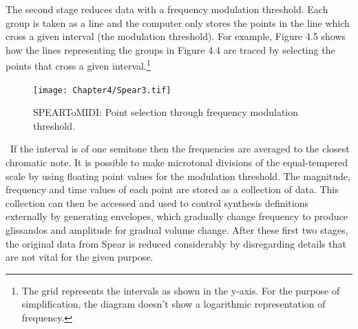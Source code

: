 The second stage reduces data with a frequency modulation threshold. Each group is taken as a line and the computer only stores the points in the line which cross a given interval (the modulation threshold). For example, Figure 4.5 shows how the lines representing the groups in Figure 4.4 are traced by selecting the points that cross a given interval.\footnote{The grid represents the intervals as shown in the y-axis. For the purpose of simplification, the diagram doesn't show a logarithmic representation of frequency.} 
\begin{figure}[htbp] %
   \centering
   \texttt{[image: Chapter4/Spear3.tif]} %
   \caption{SPEARToMIDI: Point selection through frequency modulation threshold.}
   \label{fig:example}
\end{figure}\
If the interval is of one semitone then the frequencies are averaged to the closest chromatic note. It is possible to make microtonal divisions of the equal-tempered scale by using floating point values for the modulation threshold. The magnitude, frequency and time values of each point are stored as a collection of data. This collection can then be accessed and used to control synthesis definitions externally by generating envelopes, which gradually change frequency to produce glissandos and amplitude for gradual volume change. After these first two stages, the original data from Spear is reduced considerably by disregarding details that are not vital for the given purpose. 

